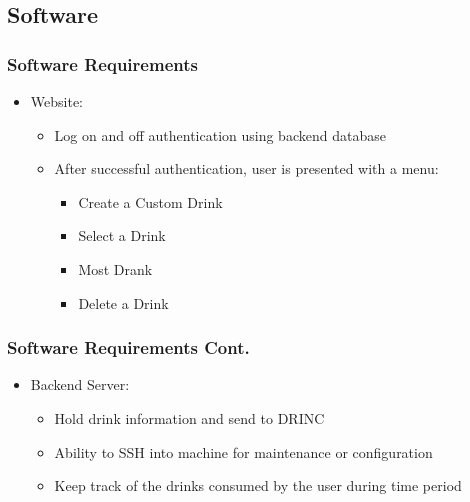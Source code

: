 \subsection{Software}

\begin{frame}
    \frametitle{Software Requirements}
    \begin{itemize}
        \item {\large Website:}
        \begin{itemize}
            \item Log on and off authentication using backend database
            \item After successful authentication, user is presented with a menu:
            \begin{itemize}
                \item Create a Custom Drink
                \item Select a Drink
                \item Most Drank
                \item Delete a Drink
            \end{itemize}
        \end{itemize}
    \end{itemize}
\end{frame}

\begin{frame}
    \frametitle{Software Requirements Cont.}
    \begin{itemize}
        \item {\large Backend Server:}
        \begin{itemize}
            \item Hold drink information and send to DRINC
            \item Ability to SSH into machine for maintenance or configuration
            \item Keep track of the drinks consumed by the user during time period
        \end{itemize}
    \end{itemize}
\end{frame}


